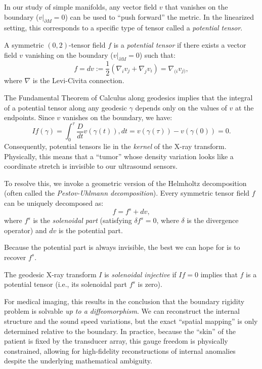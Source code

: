In our study of simple manifolds, any vector field $v$ that vanishes on the boundary ($v|_{\partial M} = 0$) can be used to ``push forward'' the metric. In the linearized setting, this corresponds to a specific type of tensor called a \emph{potential tensor}.

\begin{definition}
  A symmetric $(0,2)$-tensor field $f$ is a \emph{potential tensor} if there exists a vector field $v$ vanishing on the boundary ($v|_{\partial M} = 0$) such that:
  \[%
    f = dv := \frac{1}{2}(\nabla_i v_j + \nabla_j v_i) = \nabla_{(i} v_{j)}
  ,\]%
  where $\nabla$ is the Levi-Civita connection.
\end{definition}

The Fundamental Theorem of Calculus along geodesics implies that the integral of a potential tensor along any geodesic $\gamma$ depends only on the values of $v$ at the endpoints. Since $v$ vanishes on the boundary, we have:
\[%
  If(\gamma) = \int_{0}^{\tau} \frac{D}{dt} v(\gamma(t)) , dt = v(\gamma(\tau)) - v(\gamma(0)) = 0
.\]%
Consequently, potential tensors lie in the \emph{kernel} of the X-ray transform. Physically, this means that a ``tumor'' whose density variation looks like a coordinate stretch is invisible to our ultrasound sensors.

To resolve this, we invoke a geometric version of the Helmholtz decomposition (often called the \emph{Pestov-Uhlmann decomposition}). Every symmetric tensor field $f$ can be uniquely decomposed as:
\[%
  f = f^s + dv
,\]%
where $f^s$ is the \emph{solenoidal part} (satisfying $\delta f^s = 0$, where $\delta$ is the divergence operator) and $dv$ is the potential part.

Because the potential part is always invisible, the best we can hope for is to recover $f^s$.

\begin{definition}
  The geodesic X-ray transform $I$ is \emph{solenoidal injective} if $If = 0$ implies that $f$ is a potential tensor (i.e., its solenoidal part $f^s$ is zero).
\end{definition}

For medical imaging, this results in the conclusion that the boundary rigidity problem is solvable \emph{up to a diffeomorphism}. We can reconstruct the internal structure and the sound speed variations, but the exact ``spatial mapping'' is only determined relative to the boundary. In practice, because the ``skin'' of the patient is fixed by the transducer array, this gauge freedom is physically constrained, allowing for high-fidelity reconstructions of internal anomalies despite the underlying mathematical ambiguity.

